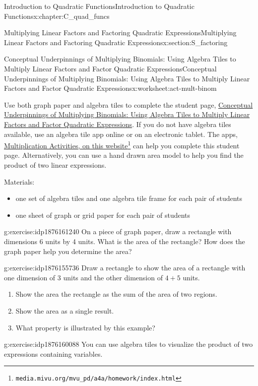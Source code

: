 \documentclass[oneside,10pt,]{book}
\numberwithin{equation}{chapter}
\begin{document}
\begin{chapterptx}{Introduction to Quadratic Functions}{}{Introduction to Quadratic Functions}{}{}{x:chapter:C_quad_funcs}
\begin{sectionptx}{Multiplying Linear Factors and Factoring Quadratic Expressions}{}{Multiplying Linear Factors and Factoring Quadratic Expressions}{}{}{x:section:S_factoring}
\begin{worksheet-subsection}{Conceptual Underpinnings of Multiplying Binomials: Using Algebra Tiles to Multiply Linear Factors and Factor Quadratic Expressions}{}{Conceptual Underpinnings of Multiplying Binomials: Using Algebra Tiles to Multiply Linear Factors and Factor Quadratic Expressions}{}{}{x:worksheet:act-mult-binom}
\begin{introduction}{}
Use both graph paper and algebra tiles to complete the student page, \hyperref[x:worksheet:act-mult-binom]{Conceptual Underpinnings of Multiplying Binomials: Using Algebra Tiles to Multiply Linear Factors and Factor Quadratic Expressions}. If you do not have algebra tiles available, use an algebra tile app online or on an electronic tablet. The apps, \href{http://media.mivu.org/mvu_pd/a4a/homework/index.html}{Multiplication Activities, on this website}\footnote{\nolinkurl{media.mivu.org/mvu_pd/a4a/homework/index.html}\label{g:fn:idp1876149720}} can help you complete this student page. Alternatively, you can use a hand drawn area model to help you find the product of two linear expressions.%
\par
Materials:%
\begin{itemize}[label=\textbullet]
\item{}one set of algebra tiles and one algebra tile frame for each pair of students%
\item{}one sheet of graph or grid paper for each pair of students%
\end{itemize}
%
\end{introduction}%
\begin{divisionexercise}{1}{}{}{g:exercise:idp1876161240}%
On a piece of graph paper, draw a rectangle with dimensions 6 units by 4 units. What is the area of the rectangle? How does the graph paper help you determine the area?%
\end{divisionexercise}%
\begin{divisionexercise}{2}{}{}{g:exercise:idp1876155736}%
Draw a rectangle to show the area of a rectangle with one dimension of 3 units and the other dimension of \(4 + 5\) units.%
\begin{enumerate}[font=\bfseries,label=(\alph*),ref=\alph*]
\item{}Show the area the rectangle as the sum of the area of two regions.%
\item{}Show the area as a single result.%
\item{}What property is illustrated by this example?%
\end{enumerate}
\end{divisionexercise}%
\begin{divisionexercise}{3}{}{}{g:exercise:idp1876160088}%
You can use algebra tiles to visualize the product of two expressions containing variables.%
\begin{enumerate}[font=\bfseries,label=(\alph*),ref=\alph*]

\end{enumerate}
\end{divisionexercise}
\end{worksheet-subsection}
\end{sectionptx}
\end{chapterptx}
\end{document}
